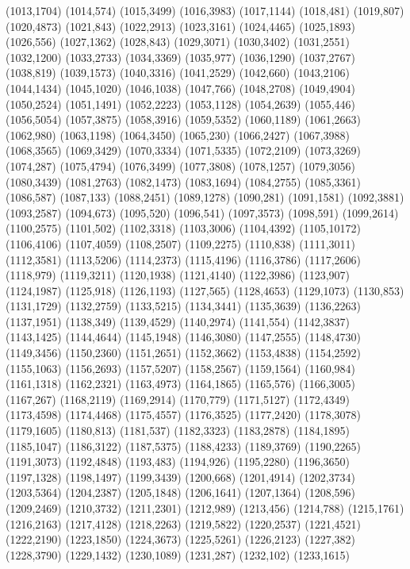 (1013,1704)
(1014,574)
(1015,3499)
(1016,3983)
(1017,1144)
(1018,481)
(1019,807)
(1020,4873)
(1021,843)
(1022,2913)
(1023,3161)
(1024,4465)
(1025,1893)
(1026,556)
(1027,1362)
(1028,843)
(1029,3071)
(1030,3402)
(1031,2551)
(1032,1200)
(1033,2733)
(1034,3369)
(1035,977)
(1036,1290)
(1037,2767)
(1038,819)
(1039,1573)
(1040,3316)
(1041,2529)
(1042,660)
(1043,2106)
(1044,1434)
(1045,1020)
(1046,1038)
(1047,766)
(1048,2708)
(1049,4904)
(1050,2524)
(1051,1491)
(1052,2223)
(1053,1128)
(1054,2639)
(1055,446)
(1056,5054)
(1057,3875)
(1058,3916)
(1059,5352)
(1060,1189)
(1061,2663)
(1062,980)
(1063,1198)
(1064,3450)
(1065,230)
(1066,2427)
(1067,3988)
(1068,3565)
(1069,3429)
(1070,3334)
(1071,5335)
(1072,2109)
(1073,3269)
(1074,287)
(1075,4794)
(1076,3499)
(1077,3808)
(1078,1257)
(1079,3056)
(1080,3439)
(1081,2763)
(1082,1473)
(1083,1694)
(1084,2755)
(1085,3361)
(1086,587)
(1087,133)
(1088,2451)
(1089,1278)
(1090,281)
(1091,1581)
(1092,3881)
(1093,2587)
(1094,673)
(1095,520)
(1096,541)
(1097,3573)
(1098,591)
(1099,2614)
(1100,2575)
(1101,502)
(1102,3318)
(1103,3006)
(1104,4392)
(1105,10172)
(1106,4106)
(1107,4059)
(1108,2507)
(1109,2275)
(1110,838)
(1111,3011)
(1112,3581)
(1113,5206)
(1114,2373)
(1115,4196)
(1116,3786)
(1117,2606)
(1118,979)
(1119,3211)
(1120,1938)
(1121,4140)
(1122,3986)
(1123,907)
(1124,1987)
(1125,918)
(1126,1193)
(1127,565)
(1128,4653)
(1129,1073)
(1130,853)
(1131,1729)
(1132,2759)
(1133,5215)
(1134,3441)
(1135,3639)
(1136,2263)
(1137,1951)
(1138,349)
(1139,4529)
(1140,2974)
(1141,554)
(1142,3837)
(1143,1425)
(1144,4644)
(1145,1948)
(1146,3080)
(1147,2555)
(1148,4730)
(1149,3456)
(1150,2360)
(1151,2651)
(1152,3662)
(1153,4838)
(1154,2592)
(1155,1063)
(1156,2693)
(1157,5207)
(1158,2567)
(1159,1564)
(1160,984)
(1161,1318)
(1162,2321)
(1163,4973)
(1164,1865)
(1165,576)
(1166,3005)
(1167,267)
(1168,2119)
(1169,2914)
(1170,779)
(1171,5127)
(1172,4349)
(1173,4598)
(1174,4468)
(1175,4557)
(1176,3525)
(1177,2420)
(1178,3078)
(1179,1605)
(1180,813)
(1181,537)
(1182,3323)
(1183,2878)
(1184,1895)
(1185,1047)
(1186,3122)
(1187,5375)
(1188,4233)
(1189,3769)
(1190,2265)
(1191,3073)
(1192,4848)
(1193,483)
(1194,926)
(1195,2280)
(1196,3650)
(1197,1328)
(1198,1497)
(1199,3439)
(1200,668)
(1201,4914)
(1202,3734)
(1203,5364)
(1204,2387)
(1205,1848)
(1206,1641)
(1207,1364)
(1208,596)
(1209,2469)
(1210,3732)
(1211,2301)
(1212,989)
(1213,456)
(1214,788)
(1215,1761)
(1216,2163)
(1217,4128)
(1218,2263)
(1219,5822)
(1220,2537)
(1221,4521)
(1222,2190)
(1223,1850)
(1224,3673)
(1225,5261)
(1226,2123)
(1227,382)
(1228,3790)
(1229,1432)
(1230,1089)
(1231,287)
(1232,102)
(1233,1615)

